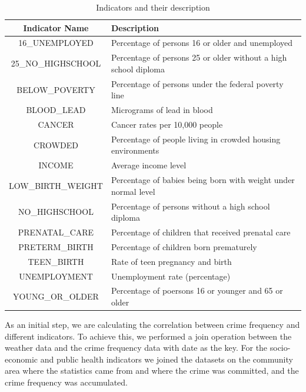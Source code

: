 \documentclass[a4paper,10pt]{article}
\begin{document}
\begin{table}
	\begin{tabular}{|c|l|}
	\hline 
	\textbf{Indicator Name} & \textbf{Description} \\ 
	\hline 
	16\_UNEMPLOYED & Percentage of persons 16 or older and unemployed \\\hline
25\_NO\_HIGHSCHOOL & Percentage of persons 25 or older without a high school diploma \\\hline
BELOW\_POVERTY & Percentage of persons under the federal poverty line\\\hline
BLOOD\_LEAD & Micrograms of lead in blood\\\hline
CANCER & Cancer rates per 10,000 people\\\hline
CROWDED & Percentage of people living in crowded housing environments\\\hline
INCOME & Average income level\\\hline
LOW\_BIRTH\_WEIGHT & Percentage of babies being born with weight under normal level\\\hline
NO\_HIGHSCHOOL & Percentage of persons without a high school diploma\\\hline
PRENATAL\_CARE & Percentage of children that received prenatal care\\\hline
PRETERM\_BIRTH & Percentage of children born prematurely\\\hline
TEEN\_BIRTH & Rate of teen pregnancy and birth\\\hline
UNEMPLOYMENT & Unemployment rate (percentage)\\\hline
YOUNG\_OR\_OLDER & Percentage of poersons 16 or younger and 65 or older \\
\hline
	\end{tabular} 
	\caption{Indicators and their description}
\end{table}

As an initial step, we are calculating the correlation between crime frequency and different indicators. To achieve this, we performed a join operation between the weather data and the crime frequency data with date as the key. For the socio-economic and public health indicators we joined the datasets on the community area where the statistics came from and where the crime was committed, and the crime frequency was accumulated.\\
\end{document}
